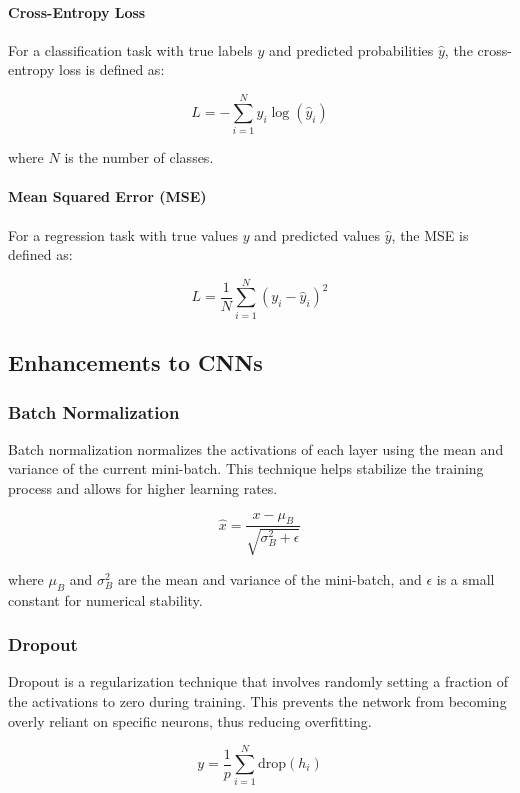 \documentclass[12pt]{article}
\begin{document}
\paragraph{Cross-Entropy Loss}

For a classification task with true labels \( y \) and predicted probabilities \( \hat{y} \), the cross-entropy loss is defined as:

\[
L = -\sum_{i=1}^{N} y_i \log(\hat{y}_i)
\]

where \( N \) is the number of classes.

\paragraph{Mean Squared Error (MSE)}

For a regression task with true values \( y \) and predicted values \( \hat{y} \), the MSE is defined as:

\[
L = \frac{1}{N} \sum_{i=1}^{N} (y_i - \hat{y}_i)^2
\]

\subsection{Enhancements to CNNs}

\subsubsection{Batch Normalization}

Batch normalization normalizes the activations of each layer using the mean and variance of the current mini-batch. This technique helps stabilize the training process and allows for higher learning rates.

\[
\hat{x} = \frac{x - \mu_B}{\sqrt{\sigma_B^2 + \epsilon}}
\]

where \( \mu_B \) and \( \sigma_B^2 \) are the mean and variance of the mini-batch, and \( \epsilon \) is a small constant for numerical stability.

\subsubsection{Dropout}

Dropout is a regularization technique that involves randomly setting a fraction of the activations to zero during training. This prevents the network from becoming overly reliant on specific neurons, thus reducing overfitting.

\[
y = \frac{1}{p} \sum_{i=1}^{N} \text{drop}(h_i)
\]
\end{document}

